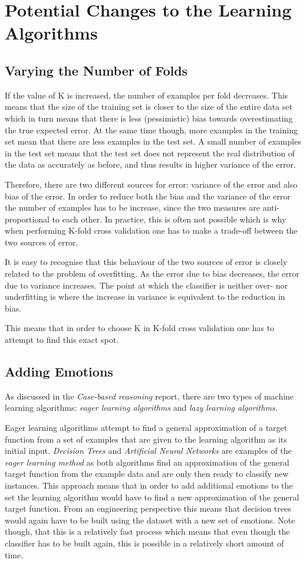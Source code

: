 \documentclass[10pt,a4paper]{article}
\begin{document}
\section{Potential Changes to the Learning Algorithms}
\subsection{Varying the Number of Folds}
If the value of K is increased, the number of examples per fold decreases. This means that the size of the training set is closer to the size of the entire data set which in turn means that there is less (pessimistic) bias towards overestimating the true expected error. At the same time though, more examples in the training set mean that there are less examples in the test set. A small number of examples in the test set means that the test set does not represent the real distribution of the data as accurately as before, and thus results in higher variance of the error.

Therefore, there are two different sources for error: variance of the error and also bias of the error. In order to reduce both the bias and the variance of the error the number of examples has to be increase, since the two measures are anti-proportional to each other. In practice, this is often not possible which is why when performing K-fold cross validation one has to make a trade-off between the two sources of error. 

It is easy to recognise that this behaviour of the two sources of error is closely related to the problem of overfitting. As the error due to bias decreases, the error due to variance increases. The point at which the classifier is neither over- nor underfitting is where the increase in variance is equivalent to the reduction in bias.

This means that in order to choose K in K-fold cross validation one has to attempt to find this exact spot.

\subsection{Adding Emotions}
As discussed in the \emph{Case-based reasoning} report, there are two types of machine learning algorithms: \emph{eager learning algorithms} and \emph{lazy learning algorithms}. 

Eager learning algorithms attempt to find a general approximation of a target function from a set of examples that are given to the learning algorithm as its initial input. \emph{Decision Trees} and \emph{Artificial Neural Networks} are examples of the \emph{eager learning method} as both algorithms find an approximation of the general target function from the example data and are only then ready to classify new instances. This approach means that in order to add additional emotions to the set the learning algorithm would have to find a new approximation of the general target function. From an engineering perspective this means that decision trees would again have to be built using the dataset with a new set of emotions. Note though, that this is a relatively fast process which means that even though the classifier has to be built again, this is possible in a relatively short amount of time.
\end{document}
